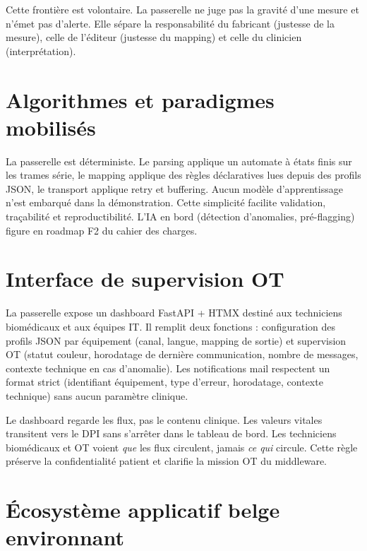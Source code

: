 Cette frontière est volontaire. La passerelle ne juge pas la gravité d'une mesure et n'émet pas d'alerte. Elle sépare la responsabilité du fabricant (justesse de la mesure), celle de l'éditeur (justesse du mapping) et celle du clinicien (interprétation).

\section{Algorithmes et paradigmes mobilisés}
\label{sec:algorithmes}

La passerelle est déterministe. Le parsing applique un automate à états finis sur les trames série, le mapping applique des règles déclaratives lues depuis des profils JSON, le transport applique retry et buffering. Aucun modèle d'apprentissage n'est embarqué dans la démonstration. Cette simplicité facilite validation, traçabilité et reproductibilité. L'IA en bord (détection d'anomalies, pré-flagging) figure en roadmap F2 du cahier des charges.

\section{Interface de supervision OT}
\label{sec:dashboard}

La passerelle expose un dashboard FastAPI + HTMX destiné aux techniciens biomédicaux et aux équipes IT. Il remplit deux fonctions : configuration des profils JSON par équipement (canal, langue, mapping de sortie) et supervision OT (statut couleur, horodatage de dernière communication, nombre de messages, contexte technique en cas d'anomalie). Les notifications mail respectent un format strict (identifiant équipement, type d'erreur, horodatage, contexte technique) sans aucun paramètre clinique.

\begin{bridgekey}
Le dashboard regarde les flux, pas le contenu clinique. Les valeurs vitales transitent vers le DPI sans s'arrêter dans le tableau de bord. Les techniciens biomédicaux et OT voient \emph{que} les flux circulent, jamais \emph{ce qui} circule. Cette règle préserve la confidentialité patient et clarifie la mission OT du middleware.
\end{bridgekey}

\section{Écosystème applicatif belge environnant}
\label{sec:ecosysteme-belge}

